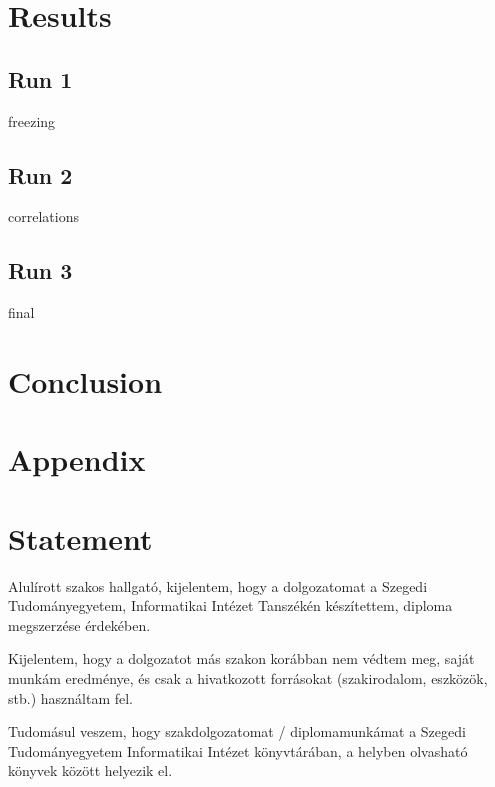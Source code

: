 \documentclass[12pt]{report}
\begin{document}
\chapter{Results}
\section{Run 1}
freezing
\section{Run 2}
correlations
\section{Run 3}
final
\chapter{Conclusion}
\chapter{Appendix}
\chapter*{Statement}



\noindent
Alulírott \makebox[4cm]{\dotfill} szakos hallgató, kijelentem, hogy a dolgozatomat a Szegedi Tudományegyetem, Informatikai Intézet \makebox[4cm]{\dotfill} Tanszékén készítettem, \makebox[4cm]{\dotfill} diploma megszerzése érdekében.

Kijelentem, hogy a dolgozatot más szakon korábban nem védtem meg, saját munkám eredménye, és csak a hivatkozott forrásokat (szakirodalom, eszközök, stb.) használtam fel.

Tudomásul veszem, hogy szakdolgozatomat / diplomamunkámat a Szegedi Tudományegyetem Informatikai Intézet könyvtárában, a helyben olvasható könyvek között helyezik el.
\end{document}
